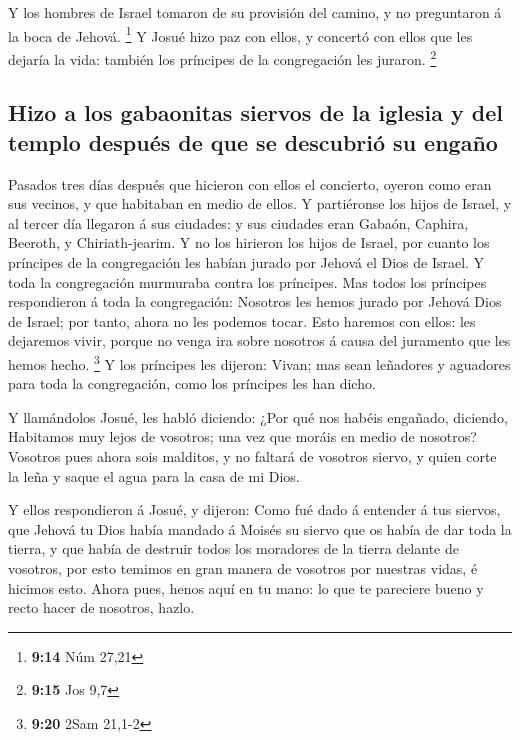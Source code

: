  Y los hombres de Israel tomaron de su provisión del
camino, y no preguntaron á la boca de Jehová. \footnote{\textbf{9:14}
  Núm 27,21}  Y Josué hizo paz con ellos, y concertó con
ellos que les dejaría la vida: también los príncipes de la congregación
les juraron. \footnote{\textbf{9:15} Jos 9,7}

\hypertarget{hizo-a-los-gabaonitas-siervos-de-la-iglesia-y-del-templo-despuuxe9s-de-que-se-descubriuxf3-su-engauxf1o}{%
\subsection{Hizo a los gabaonitas siervos de la iglesia y del templo
después de que se descubrió su
engaño}\label{hizo-a-los-gabaonitas-siervos-de-la-iglesia-y-del-templo-despuuxe9s-de-que-se-descubriuxf3-su-engauxf1o}}

 Pasados tres días después que hicieron con ellos el
concierto, oyeron como eran sus vecinos, y que habitaban en medio de
ellos.  Y partiéronse los hijos de Israel, y al tercer día
llegaron á sus ciudades: y sus ciudades eran Gabaón, Caphira, Beeroth, y
Chiriath-jearim.  Y no los hirieron los hijos de Israel,
por cuanto los príncipes de la congregación les habían jurado por Jehová
el Dios de Israel. Y toda la congregación murmuraba contra los
príncipes.  Mas todos los príncipes respondieron á toda la
congregación: Nosotros les hemos jurado por Jehová Dios de Israel; por
tanto, ahora no les podemos tocar.  Esto haremos con ellos:
les dejaremos vivir, porque no venga ira sobre nosotros á causa del
juramento que les hemos hecho. \footnote{\textbf{9:20} 2Sam 21,1-2}
 Y los príncipes les dijeron: Vivan; mas sean leñadores y
aguadores para toda la congregación, como los príncipes les han dicho.

 Y llamándolos Josué, les habló diciendo: ¿Por qué nos
habéis engañado, diciendo, Habitamos muy lejos de vosotros; una vez que
moráis en medio de nosotros?  Vosotros pues ahora sois
malditos, y no faltará de vosotros siervo, y quien corte la leña y saque
el agua para la casa de mi Dios.

 Y ellos respondieron á Josué, y dijeron: Como fué dado á
entender á tus siervos, que Jehová tu Dios había mandado á Moisés su
siervo que os había de dar toda la tierra, y que había de destruir todos
los moradores de la tierra delante de vosotros, por esto temimos en gran
manera de vosotros por nuestras vidas, é hicimos esto. 
Ahora pues, henos aquí en tu mano: lo que te pareciere bueno y recto
hacer de nosotros, hazlo.

